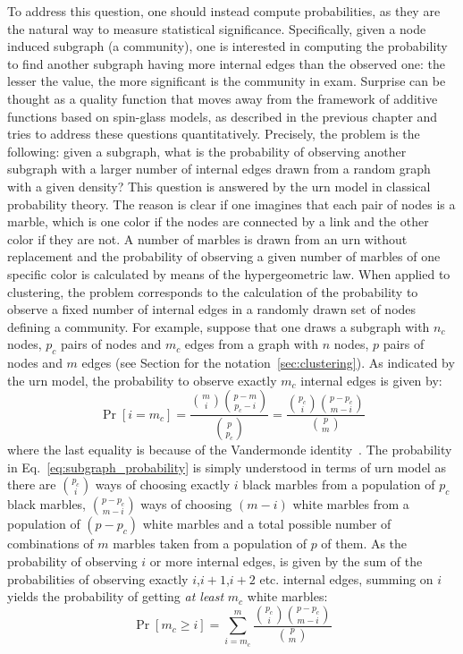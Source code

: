 To address this question, one should instead compute probabilities, as they are the natural way to measure statistical significance.
Specifically, given a node induced subgraph (a community), one is interested in computing the probability to find another subgraph having more internal edges than the observed one: the lesser the value, the more significant is the community in exam. Surprise can be thought as a quality function that moves away from the framework of additive functions based on spin-glass models, as described in the previous chapter and tries to address these questions quantitatively.
Precisely, the problem is the following: given a subgraph, what is the probability of observing another subgraph with a larger number of internal edges drawn from a random graph with a given density?
This question is answered by the urn model in classical probability theory. The reason is clear if one imagines that each pair of nodes is a marble, which is one color if the nodes are connected by a link and the other color if they are not.
A number of marbles is drawn from an urn without replacement and the probability of observing a given number of marbles of one specific color is calculated by means of the hypergeometric law.
When applied to clustering, the problem corresponds to the calculation of the probability to observe a fixed number of internal edges in a randomly drawn set of nodes defining a community.
For example, suppose that one draws a subgraph with $n_c$ nodes, $p_c$ pairs of nodes and $m_c$ edges from a graph with $n$ nodes, $p$ pairs of nodes and $m$ edges (see Section for the notation~\ref{sec:clustering}).
As indicated by the urn model, the probability to observe exactly $m_c$ internal edges is given by:
\begin{equation}\label{eq:subgraph_probability}
\Pr[i=m_c] = \frac{\binom{m}{i}\binom{p-m}{p_c-i} }{\binom{p}{p_c}} = \frac{\binom{p_c}{i} \binom{p-p_c}{m-i}}{\binom{p}{m}}
\end{equation}
where the last equality is because of the Vandermonde identity~\cite{feller1968}.
The probability in Eq.~\ref{eq:subgraph_probability} is simply understood in terms of urn model as there are $\binom{p_c}{i}$ ways of choosing exactly $i$ black marbles from a population of $p_c$ black marbles, $\binom{p-p_c}{m-i}$ ways of choosing $(m-i)$ white marbles from a population of $(p-p_c)$ white marbles and a total possible number of combinations of $m$ marbles taken from a population of $p$ of them.
As the probability of observing $i$ or more internal edges, is given by the sum of the probabilities of observing exactly $i$,$i+1$,$i+2$ etc. internal edges, summing on $i$ yields the probability of getting \emph{at least} $m_c$ white marbles:
\begin{equation}\label{eq:subgraph_probability_marginalized}
\Pr[ m_c \geq i ] = \sum\limits_{i=m_c}^{m} \frac{\binom{p_c}{i} \binom{p-p_c}{m-i}}{\binom{p}{m}}
\end{equation}

